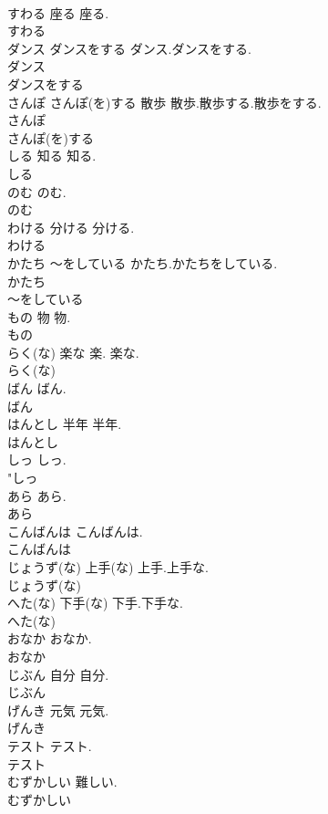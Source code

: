 \documentclass[8pt]{extreport}
\begin{document}
\begin{CJK}{UTF8}{min}
\\	すわる	座る	座る.	
\\	すわる
\\	ダンス ダンスをする		ダンス.ダンスをする.	
\\	ダンス
\\	ダンスをする
\\	さんぽ さんぽ(を)する	散歩	散歩.散歩する.散歩をする.	
\\	さんぽ
\\	さんぽ(を)する
\\	しる	知る	知る.	
\\	しる
\\	のむ		のむ.	
\\	のむ
\\	わける	分ける	分ける.	
\\	わける
\\	かたち ～をしている		かたち.かたちをしている.	
\\	かたち
\\	～をしている
\\	もの	物	物.	
\\	もの
\\	らく(な)	楽な	楽. 楽な.	
\\	らく(な)
\\	ばん		ばん.	
\\	ばん
\\	はんとし	半年	半年.	
\\	はんとし
\\	しっ		しっ.	
\\	"しっ
\\	あら		あら.	
\\	あら
\\	こんばんは		こんばんは.	
\\	こんばんは
\\	じょうず(な)	上手(な)	上手.上手な.	
\\	じょうず(な)
\\	へた(な)	下手(な)	下手.下手な.	
\\	へた(な)
\\	おなか		おなか.	
\\	おなか
\\	じぶん	自分	自分.	
\\	じぶん
\\	げんき	元気	元気.	
\\	げんき
\\	テスト		テスト.	
\\	テスト
\\	むずかしい		難しい.	
\\	むずかしい

\end{CJK}
\end{document}
